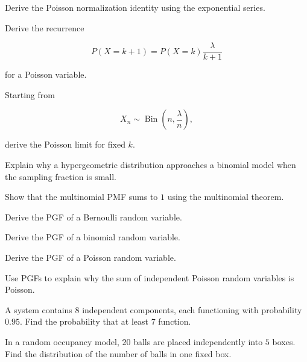 \begin{exercise}[3]
Derive the Poisson normalization identity using the exponential series.
\end{exercise}

\begin{exercise}[3]
Derive the recurrence

\[
P(X=k+1)
=
P(X=k)\frac{\lambda}{k+1}
\]

for a Poisson variable.
\end{exercise}

\begin{exercise}[3]
Starting from

\[
X_n\sim
\operatorname{Bin}
\left(
n,\frac{\lambda}{n}
\right),
\]

derive the Poisson limit for fixed \(k\).
\end{exercise}

\begin{exercise}[3]
Explain why a hypergeometric distribution approaches a binomial model
when the sampling fraction is small.
\end{exercise}

\begin{exercise}[3]
Show that the multinomial PMF sums to \(1\) using the multinomial
theorem.
\end{exercise}

\begin{exercise}[3]
Derive the PGF of a Bernoulli random variable.
\end{exercise}

\begin{exercise}[3]
Derive the PGF of a binomial random variable.
\end{exercise}

\begin{exercise}[3]
Derive the PGF of a Poisson random variable.
\end{exercise}

\begin{exercise}[3]
Use PGFs to explain why the sum of independent Poisson random variables
is Poisson.
\end{exercise}

\begin{exercise}[3]
A system contains \(8\) independent components, each functioning with
probability \(0.95\). Find the probability that at least \(7\) function.
\end{exercise}

\begin{exercise}[3]
In a random occupancy model, \(20\) balls are placed independently into
\(5\) boxes. Find the distribution of the number of balls in one fixed
box.
\end{exercise}

